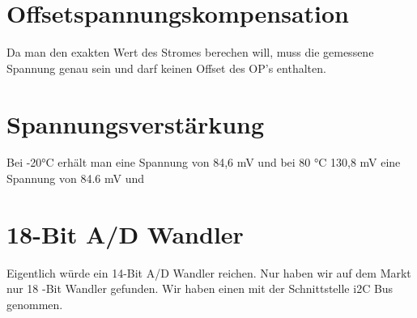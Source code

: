\section{Offsetspannungskompensation}
Da man  den exakten Wert des Stromes berechen will, muss die gemessene Spannung
genau sein und darf keinen Offset des OP's enthalten.

\section{Spannungsverstärkung}
Bei -20°C erhält man eine Spannung von 84,6 mV und bei 80 °C  130,8 mV
eine Spannung von 84.6 mV und

\section{18-Bit A/D Wandler}

Eigentlich würde ein 14-Bit A/D Wandler reichen. Nur haben wir auf dem Markt nur
18 -Bit Wandler gefunden. Wir haben einen mit der Schnittstelle i2C Bus
genommen.



